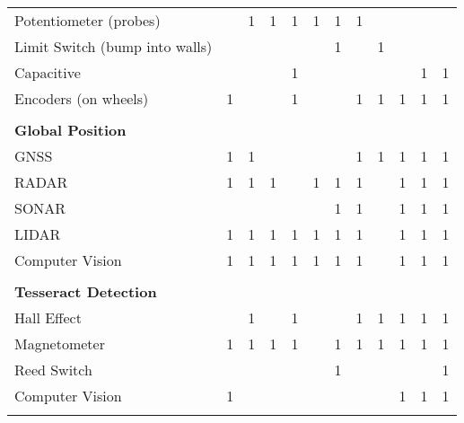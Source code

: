 \documentclass[12pt]{article}
\begin{document}
\begin{table}[H]
\begin{tabular}{p{15.645em}|c|c|c|c|c|c|c|c|c|c|c}
    Potentiometer (probes) &       & 1     & 1     & 1     & 1     & 1     & 1     &       &       &       &  \\
    Limit Switch (bump into walls) &       &       &       &       &       & 1     &       & 1     &       &       &  \\
    Capacitive &       &       &       & 1     &       &       &       &       &       & 1     & 1 \\
    Encoders (on wheels) & 1     &       &       & 1     &       &       & 1     & 1     & 1     & 1     & 1 \\
    \multicolumn{1}{r|}{} &       &       &       &       &       &       &       &       &       &       &  \\
    \midrule
    \textbf{Global Position} &       &       &       &       &       &       &       &       &       &       &  \\
\rowcolor{green}    GNSS  & 1     & 1     &       &       &       &       & 1     & 1     & 1     & 1     & 1 \\
    RADAR & 1     & 1     & 1     &       & 1     & 1     & 1     &       & 1     & 1     & 1 \\
    SONAR &       &       &       &       &       & 1     & 1     &       & 1     & 1     & 1 \\
\rowcolor{green}    LIDAR & 1     & 1     & 1     & 1     & 1     & 1     & 1     &       & 1     & 1     & 1 \\
    Computer Vision & 1     & 1     & 1     & 1     & 1     & 1     & 1     &       & 1     & 1     & 1 \\
    \multicolumn{1}{r|}{} &       &       &       &       &       &       &       &       &       &       &  \\
    \midrule
    \textbf{Tesseract Detection} &       &       &       &       &       &       &       &       &       &       &  \\
    Hall Effect &       & 1     &       & 1     &       &       & 1     & 1     & 1     & 1     & 1 \\
\rowcolor{green}    Magnetometer & 1     & 1     & 1     & 1     &       & 1     & 1     & 1     & 1     & 1     & 1 \\
    Reed Switch &       &       &       &       &       & 1     &       &       &       &       & 1 \\
    Computer Vision & 1     &       &       &       &       &       &       &       & 1     & 1     & 1 \\
    \multicolumn{1}{r|}{} &       &       &       &       &       &       &       &       &       &       &  \\

\end{tabular}
\end{table}
\end{document}
